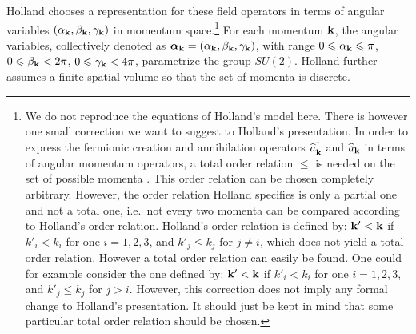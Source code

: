 \documentclass[12pt]{article}
\begin{document}
Holland chooses a representation for these field operators in terms of angular variables $(\alpha_{\bf k},\beta_{\bf k},\gamma_{\bf k})$ in momentum space.{\footnote{We do not reproduce the equations of Holland's model here. There is however one small correction we want to suggest to Holland's presentation. In order to express the fermionic creation and annihilation operators ${\widehat a}^\dagger_{\bf k}$ and ${\widehat a}_{\bf k}$ in terms of angular momentum operators, a total order relation $\leqslant$ is needed on the set of possible momenta \cite{jordan28}. This order relation can be chosen completely arbitrary. However, the order relation Holland specifies is only a partial one and not a total one, i.e.\ not every two momenta can be compared according to Holland's order relation. Holland's order relation is defined by: ${\bf k}' < {\bf k}$ if $k'_i < k_i$ for one $i=1,2,3$, and $k'_j \leqslant k_j$ for $j \neq i$, which does not yield a total order relation. However a total order relation can easily be found. One could for example consider the one defined by: ${\bf k}' < {\bf k}$ if $k'_i < k_i$ for one $i=1,2,3$, and $k'_j \leqslant k_j$ for $j > i$. However, this correction does not imply any formal change to Holland's presentation. It should just be kept in mind that some particular total order relation should be chosen.\label{totalorder}}} For each momentum ${\bf k}$, the angular variables, collectively denoted as ${\boldsymbol \alpha}_{\bf k}=(\alpha_{\bf k},\beta_{\bf k},\gamma_{\bf k})$, with range $0 \leqslant \alpha_{\bf k} \leqslant \pi$, $0 \leqslant \beta_{\bf k} < 2\pi$, $0 \leqslant \gamma_{\bf k} < 4\pi$, parametrize the group $SU(2)$. Holland further assumes a finite spatial volume so that the set of momenta is discrete.
\end{document}
